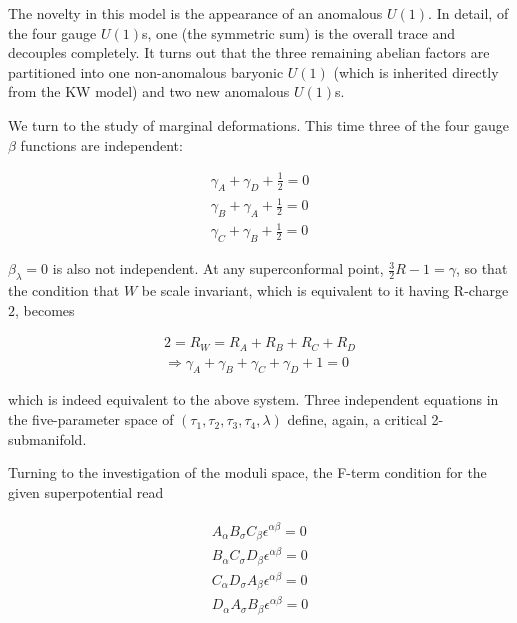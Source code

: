 The novelty in this model is the appearance of an anomalous $U(1)$. In detail, of the four gauge $U(1)$s, one (the symmetric sum) is the overall trace and decouples completely. It turns out that the three remaining abelian factors are partitioned into one non-anomalous baryonic $U(1)$ (which is inherited directly from the KW model) and two new anomalous $U(1)$s.

We turn to the study of marginal deformations. This time three of the four gauge $\beta$ functions are independent:

\begin{equation}
	\begin{split}
	\gamma_A + \gamma_D + \frac{1}{2} = 0 \\
	\gamma_B + \gamma_A + \frac{1}{2} = 0 \\
	\gamma_C + \gamma_B + \frac{1}{2} = 0 
	\end{split}
\end{equation}

$\beta_\lambda = 0$ is also not independent. At any superconformal point, $\frac{3}{2}R - 1 = \gamma$, so that the condition that $W$ be scale invariant, which is equivalent to it having R-charge $2$, becomes

\begin{equation}
	\begin{split}
	2 = R_W = R_A + R_B + R_C + R_D \\\Rightarrow \gamma_A + \gamma_B + \gamma_C + \gamma_D + 1 = 0
	\label{}
\end{split}
\end{equation}

which is indeed equivalent to the above system. Three independent equations in the five-parameter space of $(\tau_1,\tau_2,\tau_3,\tau_4,\lambda)$ define, again, a critical 2-submanifold.

Turning to the investigation of the moduli space, the F-term condition for the given superpotential read

\begin{align}
	\begin{split}
	A_\alpha B_\sigma C_\beta \epsilon^{\alpha\beta} = 0 \\
	B_\alpha C_\sigma D_\beta \epsilon^{\alpha\beta} = 0 \\
	C_\alpha D_\sigma A_\beta \epsilon^{\alpha\beta} = 0 \\
	D_\alpha A_\sigma B_\beta \epsilon^{\alpha\beta} = 0 
	\label{}
\end{split}
\end{align}

